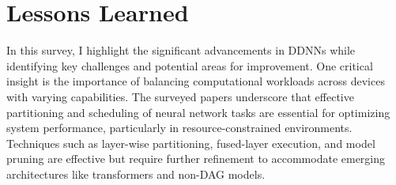 \documentclass[conference]{IEEEtran}
\begin{document}





\section{Lessons Learned}

In this survey, I highlight the significant advancements in DDNNs while identifying key challenges and potential areas for improvement. One critical insight is the importance of balancing computational workloads across devices with varying capabilities. The surveyed papers underscore that effective partitioning and scheduling of neural network tasks are essential for optimizing system performance, particularly in resource-constrained environments. Techniques such as layer-wise partitioning, fused-layer execution, and model pruning are effective but require further refinement to accommodate emerging architectures like transformers and non-DAG models.
\end{document}
